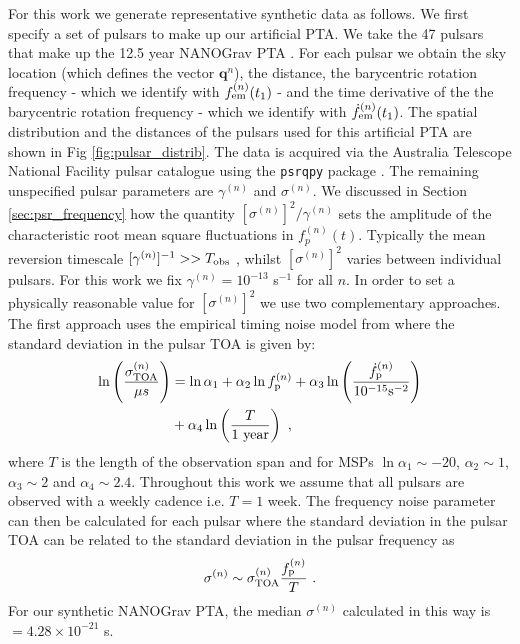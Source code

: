 \documentclass[fleqn,usenatbib,useAMS]{mnras}
\begin{document}
For this work we generate representative synthetic data as follows. We first specify a set of pulsars to make up our artificial PTA. We take the 47 pulsars that make up the 12.5 year NANOGrav PTA \citep{2020ApJ...905L..34A}. For each pulsar we obtain the sky location (which defines the vector $\boldsymbol{q}^{n}$), the distance, the barycentric rotation frequency - which we identify with $f_{\rm em}^{(n)} (t_1)$ -  and the time derivative of the the barycentric rotation frequency - which we identify with $\dot{f}_{\rm em}^{(n)} (t_1)$. The spatial distribution and the distances of the pulsars used for this artificial PTA are shown in Fig \ref{fig:pulsar_distrib}. The data is acquired via the Australia Telescope National Facility pulsar catalogue \citep{Manchester2005} using the \texttt{psrqpy} package \citep{psrqpy}. The remaining unspecified pulsar parameters are $\gamma^{(n)}$ and $\sigma^{(n)}$. We discussed in Section \ref{sec:psr_frequency} how the quantity $[\sigma^{(n)}]^2 /\gamma^{(n)} $ sets the amplitude of the characteristic root mean square fluctuations in $f_p^{(n)}(t)$. Typically the mean reversion timescale $[\gamma^{(n)}]^{-1} >> T_{\rm obs}$ \citep{Vargas}, whilst $[\sigma^{(n)}]^2$ varies between individual pulsars. For this work we fix $\gamma^{(n)} = 10^{-13}$ s$^{-1}$ for all $n$. In order to set a physically reasonable value for $[\sigma^{(n)}]^2$ we use two complementary approaches. The first approach uses the empirical timing noise model from \cite{Shannon2010ApJ...725.1607S} where the standard deviation in the pulsar TOA is given by:
\begin{align}
	\ln \left(\frac{\sigma_{\rm TOA}^{(n)}}{\mu s} \right)&= \ln \alpha_1 +  \alpha_2 \ln f_{\rm p}^{(n)} + \alpha_3 \ln \left(\frac{\dot{f}_{\rm p}^{(n)}}{10^{-15} \text{s}^{-2}} \right) \nonumber \\ 
	&+ \alpha_4 \ln \left( \frac{T}{ 1 \text{ year}} \right) \ , \label{eq:sigmap}
\end{align}
where $T$ is the length of the observation span and for MSPs $\ln \alpha_1 \sim -20 $, $\alpha_2 \sim 1$, $\alpha_3 \sim 2$ and $\alpha_4 \sim 2.4$. Throughout this work we assume that all pulsars are observed with a weekly cadence i.e. $T = 1$ week. The frequency noise parameter can then be calculated for each pulsar where the standard deviation in the pulsar TOA can be related to the standard deviation in the pulsar frequency as 
\begin{eqnarray}
	\sigma^{(n)} \sim \sigma_{\rm TOA}^{(n)} \frac{f_{\rm p}^{(n)}}{T} \ . \label{eq:sigmap_f}
\end{eqnarray}
For our synthetic NANOGrav PTA, the median $\sigma^{(n)}$ calculated in this way is $ = 4.28 \times 10^{-21} $ s. \newline 
\end{document}
